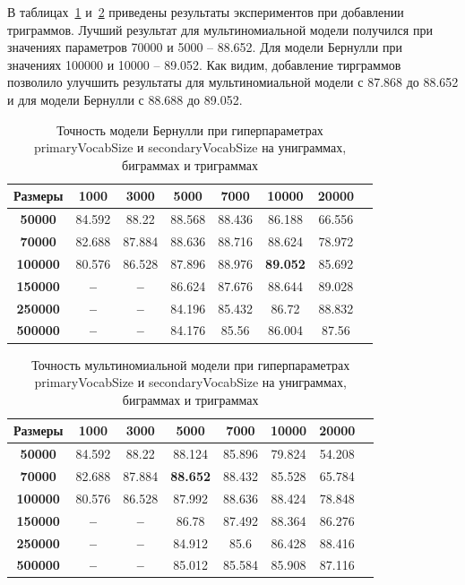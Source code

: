 В таблицах\, \ref{sizes:table:naiveBayesBnb:3gram} и\, \ref{sizes:table:naiveBayesMnb:3gram} приведены результаты экспериментов при добавлении триграммов. Лучший результат для мультиномиальной модели получился при значениях параметров 70000 и 5000 -- 88.652. Для модели Бернулли при значениях 100000 и 10000 -- 89.052. Как видим, добавление тирграммов позволило улучшить результаты для мультиномиальной модели с 87.868 до 88.652 и для модели Бернулли с 88.688 до 89.052.

\begin{table}
\begin{tabular*}{\textwidth}{c @{\extracolsep{\fill}} ccccccc}
\hline {\bf Размеры} & {\bf 1000} & {\bf 3000} & {\bf 5000} & {\bf 7000} & {\bf 10000} & {\bf 20000} \\ \hline \hline
{\bf 50000} & 84.592 & 88.22 & 88.568 & 88.436 & 86.188 & 66.556 \\ \hline
{\bf 70000} & 82.688 & 87.884 & 88.636 & 88.716 & 88.624 & 78.972 \\ \hline
{\bf 100000} & 80.576 & 86.528 & 87.896 & 88.976 & {\bf 89.052} & 85.692 \\ \hline
{\bf 150000} & {\bf --} & {\bf --} & 86.624 & 87.676 & 88.644 & 89.028 \\ \hline
{\bf 250000} & {\bf --} & {\bf --} & 84.196 & 85.432 & 86.72 & 88.832 \\ \hline
{\bf 500000} & {\bf --} & {\bf --} & 84.176 & 85.56 & 86.004 & 87.56 \\ \hline
\end{tabular*}
\caption{{Точность модели Бернулли при гиперпараметрах primaryVocabSize и secondaryVocabSize на униграммах, биграммах и триграммах}}
\label{sizes:table:naiveBayesBnb:3gram}
\end{table}

\begin{table}
\begin{tabular*}{\textwidth}{c @{\extracolsep{\fill}} ccccccc}
\hline {\bf Размеры} & {\bf 1000} & {\bf 3000} & {\bf 5000} & {\bf 7000} & {\bf 10000} & {\bf 20000} \\ \hline \hline
{\bf 50000} & 84.592 & 88.22 & 88.124 & 85.896 & 79.824 & 54.208 \\ \hline
{\bf 70000} & 82.688 & 87.884 & {\bf 88.652} & 88.432 & 85.528 & 65.784 \\ \hline
{\bf 100000} & 80.576 & 86.528 & 87.992 & 88.636 & 88.424 & 78.848 \\ \hline
{\bf 150000} & {\bf --} & {\bf --} & 86.78 & 87.492 & 88.364 & 86.276 \\ \hline
{\bf 250000} & {\bf --} & {\bf --} & 84.912 & 85.6 & 86.428 & 88.416 \\ \hline
{\bf 500000} & {\bf --} & {\bf --} & 85.012 & 85.584 & 85.908 & 87.116  \\ \hline
\end{tabular*}
\caption{{Точность мультиномиальной модели при гиперпараметрах primaryVocabSize и secondaryVocabSize на униграммах, биграммах и триграммах}}
\label{sizes:table:naiveBayesMnb:3gram}
\end{table}

